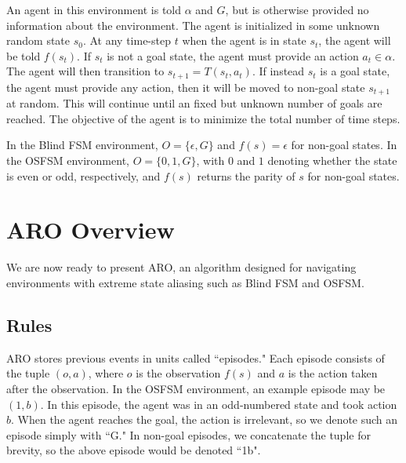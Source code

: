\documentclass[letterpaper]{article} %
\begin{document}
An agent in this environment is told $\alpha$ and $G$, but is otherwise provided no information about the environment. The agent is initialized in some unknown random state $s_0$. At any time-step $t$ when the agent is in state $s_t$, the agent will be told $f(s_t)$. If $s_t$ is not a goal state, the agent must provide an action $a_t \in \alpha$. The agent will then transition to $s_{t+1} = T(s_t, a_t)$. If instead $s_t$ is a goal state, the agent must provide any action, then it will be moved to non-goal state $s_{t+1}$ at random. This will continue until an fixed but unknown number of goals are reached. The objective of the agent is to minimize the total number of time steps.

In the Blind FSM environment, $O = \{\epsilon, G\}$ and $f(s) = \epsilon$ for non-goal states. In the OSFSM environment, $O = \{0, 1, G\}$, with $0$ and $1$ denoting whether the state is even or odd, respectively, and $f(s)$ returns the parity of $s$ for non-goal states.

\section{ARO Overview}

We are now ready to present ARO, an algorithm designed for navigating environments with extreme state aliasing such as Blind FSM and OSFSM.

\subsection{Rules}

ARO stores previous events in units called ``episodes." Each episode consists of the tuple $(o, a)$, where $o$ is the observation $f(s)$ and $a$ is the action taken after the observation. In the OSFSM environment, an example episode may be $(1,b)$. In this episode, the agent was in an odd-numbered state and took action $b$. When the agent reaches the goal, the action is irrelevant, so we denote such an episode simply with ``G." In non-goal episodes, we concatenate the tuple for brevity, so the above episode would be denoted ``1b". 
\end{document}
